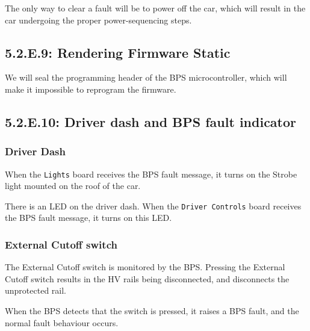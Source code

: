 \documentclass[10pt]{article}
\begin{document}
The only way to clear a fault will be to power off the car, which will result
in the car undergoing the proper power-sequencing steps.

\subsection{5.2.E.9: Rendering Firmware Static}

We will seal the programming header of the BPS microcontroller, which will
make it impossible to reprogram the firmware.

\subsection{5.2.E.10: Driver dash and BPS fault indicator}

\subsubsection{Driver Dash}

When the \texttt{Lights} board receives the BPS fault message, it turns on the
Strobe light mounted on the roof of the car.

There is an LED on the driver dash. When the \texttt{Driver Controls} board
receives the BPS fault message, it turns on this LED.

\subsubsection{External Cutoff switch}

The External Cutoff switch is monitored by the BPS. Pressing the External
Cutoff switch results in the HV rails being disconnected, and disconnects the
unprotected rail.

When the BPS detects that the switch is pressed, it raises a BPS fault, and
the normal fault behaviour occurs.


\pagebreak
\appendix
\end{document}
